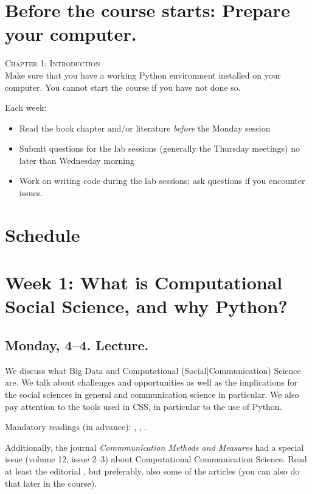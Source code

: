 
\section*{Before the course starts: Prepare your computer.}
\textsc{ Chapter 1: Introduction}\\
Make sure that you have a working Python environment installed on your computer. You cannot start the course if you have not done so.

\begin{corona}
	Each week:
	\begin{itemize}
		\item Read the book chapter and/or literature \emph{before} the Monday session
		\item Submit questions for the lab sessions (generally the Thursday meetings) no later than Wednesday morning
		\item Work on writing code during the lab sessions; ask questions if you encounter issues.
	\end{itemize}
\end{corona}

\section*{Schedule}

\section*{Week 1: What is Computational Social Science, and why Python?}
\subsection*{Monday, 4--4. Lecture.}
We discuss what Big Data and Computational (Social|Communication) Science are. We talk about challenges and opportunities as well as the implications for the social sciences in general and communication science in particular. We also pay attention to the tools used in CSS, in particular to the use of Python.

Mandatory readings (in advance):  \cite{boyd2012}, \cite{Kitchin2014}, \cite{Hilbert2019}.

Additionally, the journal \textit{Commmunication Methods and Measures} had a special issue (volume 12, issue 2--3) about Computational Communication Science. Read at least the editorial \citep{VanAtteveldt2018a}, but preferably, also some of the articles (you can also do that later in the course).


